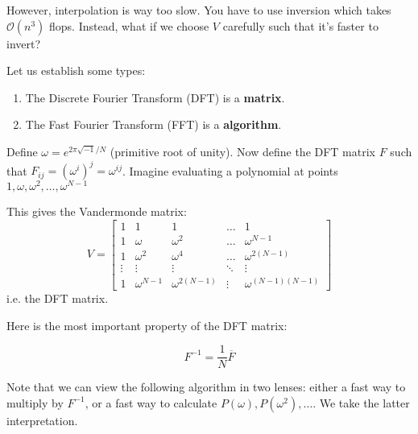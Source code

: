 However, interpolation is way too slow. You have to use inversion
which takes $\mathcal{O}(n^3)$ flops. Instead, what if we choose $V$ carefully
such that it's faster to invert?

Let us establish some types:
\begin{enumerate}
    \item The Discrete Fourier Transform (DFT) is a \textbf{matrix}.
    \item The Fast Fourier Transform (FFT) is a \textbf{algorithm}.
\end{enumerate}

\begin{definition} 
    Define $\omega = e^{2\pi \sqrt{-1}/N}$ (primitive root of unity). Now define the DFT matrix $F$
    such that $F_{ij} = (\omega^i)^j = \omega^{ij}$.
    Imagine evaluating a polynomial at points $1, \omega, \omega^2, \dots, \omega^{N - 1}$

    This gives the Vandermonde matrix:
    \[ V = \begin{bmatrix}
        1 & 1 & 1 & \dots & 1 \\
        1 & \omega & \omega^2 & \dots & \omega^{N-1} \\
        1 & \omega^2 & \omega^4 & \dots & \omega^{2(N-1)} \\
        \vdots & \vdots & \vdots & \ddots & \vdots \\
        1 & \omega^{N - 1} & \omega^{2(N - 1)} & \vdots & \omega^{(N-1)(N - 1)}
    \end{bmatrix} \]
    i.e. the DFT matrix.
\end{definition}

Here is the most important property of the DFT matrix:
\begin{note} 
    \[ F^{-1} = \frac{1}{N} \overline{F} \]
\end{note}

Note that we can view the following algorithm in two lenses: either a fast way
to multiply by $F^{-1}$, or a fast way to calculate $P(\omega), P(\omega^2), \dots$.
We take the latter interpretation.


